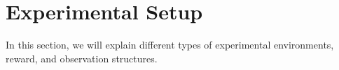 

\chapter{Experimental Setup}\label{chapter:experimental_setup}


In this section, we will explain different types of experimental environments, reward, and observation structures.  















